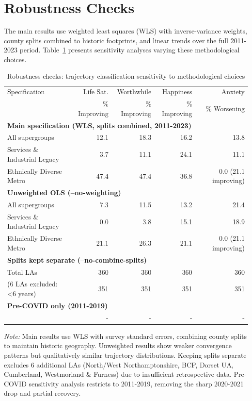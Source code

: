 \documentclass[12pt,a4paper]{article}
\begin{document}
\appendix

\section{Robustness Checks}

The main results use weighted least squares (WLS) with inverse-variance weights, county splits combined to historic footprints, and linear trends over the full 2011-2023 period. Table~\ref{tab:robustness} presents sensitivity analyses varying these methodological choices.

\begin{table}[H]
\centering
\caption{Robustness checks: trajectory classification sensitivity to methodological choices}
\label{tab:robustness}
\small
\begin{tabular}{p{5cm}*{4}{r}}
\toprule
Specification & Life Sat. & Worthwhile & Happiness & Anxiety \\
& \% Improving & \% Improving & \% Improving & \% Worsening \\
\midrule
\multicolumn{5}{l}{\textbf{Main specification (WLS, splits combined, 2011-2023)}} \\
\quad All supergroups & 12.1 & 18.3 & 16.2 & 13.8 \\
\quad Services \& Industrial Legacy & 3.7 & 11.1 & 24.1 & 11.1 \\
\quad Ethnically Diverse Metro & 47.4 & 47.4 & 36.8 & 0.0 (21.1 improving) \\
\midrule
\multicolumn{5}{l}{\textbf{Unweighted OLS (--no-weighting)}} \\
\quad All supergroups & 7.3 & 11.5 & 13.2 & 21.4 \\
\quad Services \& Industrial Legacy & 0.0 & 3.8 & 15.1 & 18.9 \\
\quad Ethnically Diverse Metro & 21.1 & 26.3 & 21.1 & 0.0 (21.1 improving) \\
\midrule
\multicolumn{5}{l}{\textbf{Splits kept separate (--no-combine-splits)}} \\
\quad Total LAs & 360 & 360 & 360 & 360 \\
\quad (6 LAs excluded: <6 years) & 351 & 351 & 351 & 351 \\
\midrule
\multicolumn{5}{l}{\textbf{Pre-COVID only (2011-2019)}} \\
\quad [To be computed] & - & - & - & - \\
\bottomrule
\end{tabular}
\begin{flushleft}
\small\textit{Note:} Main results use WLS with survey standard errors, combining county splits to maintain historic geography. Unweighted results show weaker convergence patterns but qualitatively similar trajectory distributions. Keeping splits separate excludes 6 additional LAs (North/West Northamptonshire, BCP, Dorset UA, Cumberland, Westmorland \& Furness) due to insufficient retrospective data. Pre-COVID sensitivity analysis restricts to 2011-2019, removing the sharp 2020-2021 drop and partial recovery.
\end{flushleft}
\end{table}
\end{document}
